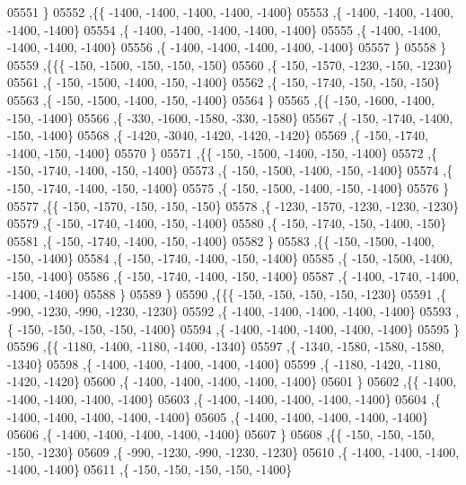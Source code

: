 \begin{DoxyCode}
05551     \}
05552    ,\{\{ -1400, -1400, -1400, -1400, -1400\}
05553     ,\{ -1400, -1400, -1400, -1400, -1400\}
05554     ,\{ -1400, -1400, -1400, -1400, -1400\}
05555     ,\{ -1400, -1400, -1400, -1400, -1400\}
05556     ,\{ -1400, -1400, -1400, -1400, -1400\}
05557     \}
05558    \}
05559   ,\{\{\{  -150, -1500,  -150,  -150,  -150\}
05560     ,\{  -150, -1570, -1230,  -150, -1230\}
05561     ,\{  -150, -1500, -1400,  -150, -1400\}
05562     ,\{  -150, -1740,  -150,  -150,  -150\}
05563     ,\{  -150, -1500, -1400,  -150, -1400\}
05564     \}
05565    ,\{\{  -150, -1600, -1400,  -150, -1400\}
05566     ,\{  -330, -1600, -1580,  -330, -1580\}
05567     ,\{  -150, -1740, -1400,  -150, -1400\}
05568     ,\{ -1420, -3040, -1420, -1420, -1420\}
05569     ,\{  -150, -1740, -1400,  -150, -1400\}
05570     \}
05571    ,\{\{  -150, -1500, -1400,  -150, -1400\}
05572     ,\{  -150, -1740, -1400,  -150, -1400\}
05573     ,\{  -150, -1500, -1400,  -150, -1400\}
05574     ,\{  -150, -1740, -1400,  -150, -1400\}
05575     ,\{  -150, -1500, -1400,  -150, -1400\}
05576     \}
05577    ,\{\{  -150, -1570,  -150,  -150,  -150\}
05578     ,\{ -1230, -1570, -1230, -1230, -1230\}
05579     ,\{  -150, -1740, -1400,  -150, -1400\}
05580     ,\{  -150, -1740,  -150, -1400,  -150\}
05581     ,\{  -150, -1740, -1400,  -150, -1400\}
05582     \}
05583    ,\{\{  -150, -1500, -1400,  -150, -1400\}
05584     ,\{  -150, -1740, -1400,  -150, -1400\}
05585     ,\{  -150, -1500, -1400,  -150, -1400\}
05586     ,\{  -150, -1740, -1400,  -150, -1400\}
05587     ,\{ -1400, -1740, -1400, -1400, -1400\}
05588     \}
05589    \}
05590   ,\{\{\{  -150,  -150,  -150,  -150, -1230\}
05591     ,\{  -990, -1230,  -990, -1230, -1230\}
05592     ,\{ -1400, -1400, -1400, -1400, -1400\}
05593     ,\{  -150,  -150,  -150,  -150, -1400\}
05594     ,\{ -1400, -1400, -1400, -1400, -1400\}
05595     \}
05596    ,\{\{ -1180, -1400, -1180, -1400, -1340\}
05597     ,\{ -1340, -1580, -1580, -1580, -1340\}
05598     ,\{ -1400, -1400, -1400, -1400, -1400\}
05599     ,\{ -1180, -1420, -1180, -1420, -1420\}
05600     ,\{ -1400, -1400, -1400, -1400, -1400\}
05601     \}
05602    ,\{\{ -1400, -1400, -1400, -1400, -1400\}
05603     ,\{ -1400, -1400, -1400, -1400, -1400\}
05604     ,\{ -1400, -1400, -1400, -1400, -1400\}
05605     ,\{ -1400, -1400, -1400, -1400, -1400\}
05606     ,\{ -1400, -1400, -1400, -1400, -1400\}
05607     \}
05608    ,\{\{  -150,  -150,  -150,  -150, -1230\}
05609     ,\{  -990, -1230,  -990, -1230, -1230\}
05610     ,\{ -1400, -1400, -1400, -1400, -1400\}
05611     ,\{  -150,  -150,  -150,  -150, -1400\}

\end{DoxyCode}
